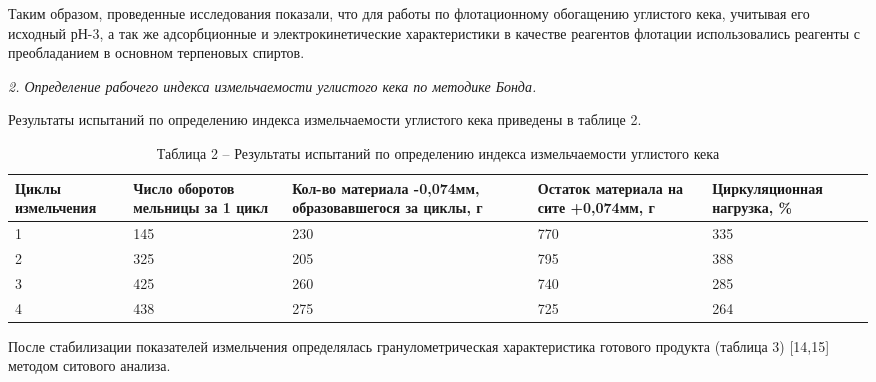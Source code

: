 \begin{multicols}{2}
Таким образом, проведенные исследования показали, что для работы по
флотационному обогащению углистого кека, учитывая его исходный рН-3, а
так же адсорбционные и электрокинетические характеристики в качестве
реагентов флотации использовались реагенты с преобладанием в основном
терпеновых спиртов.

\emph{2. Определение рабочего индекса измельчаемости углистого кека по
методике Бонда.}

Результаты испытаний по определению индекса измельчаемости углистого
кека приведены в таблице 2.
\end{multicols}

\begin{table}[H]
\caption*{Таблица 2 -- Результаты испытаний по определению индекса измельчаемости углистого кека}
\centering
\begin{tabular}{|p{}|p{}|p{}|p{}|p{}|}
\hline
Циклы измельчения & Число оборотов мельницы за 1 цикл & Кол-во материала -0,074мм, образовавшегося за циклы, г & Остаток материала на сите +0,074мм, г & Циркуляционная нагрузка, \% \\ \hline
1 & 145 & 230 & 770 & 335 \\ \hline
2 & 325 & 205 & 795 & 388 \\ \hline
3 & 425 & 260 & 740 & 285 \\ \hline
4 & 438 & 275 & 725 & 264 \\ \hline
\end{tabular}
\end{table}

После стабилизации показателей измельчения определялась
гранулометрическая характеристика готового продукта (таблица 3)
{[}14,15{]} методом ситового анализа.

